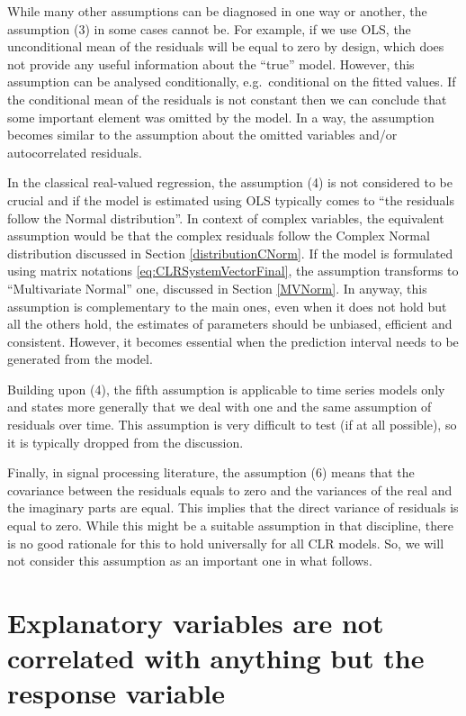 \documentclass[
]{book}
\begin{document}
While many other assumptions can be diagnosed in one way or another, the assumption (3) in some cases cannot be. For example, if we use OLS, the unconditional mean of the residuals will be equal to zero by design, which does not provide any useful information about the ``true'' model. However, this assumption can be analysed conditionally, e.g.~conditional on the fitted values. If the conditional mean of the residuals is not constant then we can conclude that some important element was omitted by the model. In a way, the assumption becomes similar to the assumption about the omitted variables and/or autocorrelated residuals.

In the classical real-valued regression, the assumption (4) is not considered to be crucial and if the model is estimated using OLS typically comes to ``the residuals follow the Normal distribution''. In context of complex variables, the equivalent assumption would be that the complex residuals follow the Complex Normal distribution discussed in Section \ref{distributionCNorm}. If the model is formulated using matrix notations \eqref{eq:CLRSystemVectorFinal}, the assumption transforms to ``Multivariate Normal'' one, discussed in Section \ref{MVNorm}. In anyway, this assumption is complementary to the main ones, even when it does not hold but all the others hold, the estimates of parameters should be unbiased, efficient and consistent. However, it becomes essential when the prediction interval needs to be generated from the model.

Building upon (4), the fifth assumption is applicable to time series models only and states more generally that we deal with one and the same assumption of residuals over time. This assumption is very difficult to test (if at all possible), so it is typically dropped from the discussion.

Finally, in signal processing literature, the assumption (6) means that the covariance between the residuals equals to zero and the variances of the real and the imaginary parts are equal. This implies that the direct variance of residuals is equal to zero. While this might be a suitable assumption in that discipline, there is no good rationale for this to hold universally for all CLR models. So, we will not consider this assumption as an important one in what follows.

\hypertarget{explanatory-variables-are-not-correlated-with-anything-but-the-response-variable}{%
\section{Explanatory variables are not correlated with anything but the response variable}\label{explanatory-variables-are-not-correlated-with-anything-but-the-response-variable}}
\end{document}
